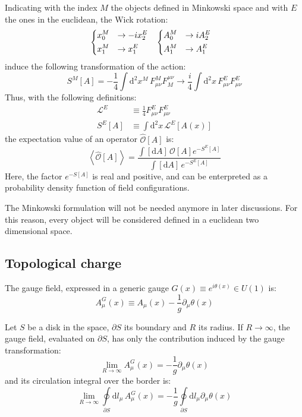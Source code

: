 Indicating with the index $M$ the objects defined in Minkowski space and with $E$ the ones in the euclidean, the Wick rotation:
\begin{align*}
    &\begin{dcases}
        x_0^M &\rightarrow -i x_2^E \\
        x_1^M &\rightarrow x_1^E
    \end{dcases}%
    &%
    \begin{dcases}
        A^M_0 &\rightarrow i A^E_2 \\
        A^M_1 &\rightarrow A^E_1 
    \end{dcases}&
\end{align*}
induce the following transformation of the action:
\[
    S^M[A] = -\frac{1}{4}\int\mathrm d^2x^M\,F^M_{\mu\nu}F_M^{\mu\nu} \rightarrow  \frac{i}{4}\int\mathrm d^2x\,F^E_{\mu\nu}F^E_{\mu\nu}
\]
Thus, with the following definitions:
\begin{equation}\label{eq:cont_action}
    \begin{aligned}
        \mathcal L^E &\equiv \frac{1}{4}F^E_{\mu\nu}F^E_{\mu\nu} \\
        S^E[A] &\equiv \int\mathrm d^2x\,\mathcal L^E[A(x)]
    \end{aligned}
\end{equation}
the expectation value of an operator $\widehat{\mathcal O}[A]$ is:
\begin{equation}\label{eq:cont_exp}
    \left< \widehat{\mathcal O}[A] \right> = \frac{\int[\mathrm dA]\, \mathcal O[A] e^{-S^E[A]}}{\int[\mathrm dA]\,e^{-S^E[A]}}
\end{equation}
Here, the factor $e^{-S[A]}$ is real and positive, and can be enterpreted as a probability density function of field configurations.

The Minkowski formulation will not be needed anymore in later discussions.
For this reason, every object will be considered defined in a euclidean two dimensional space.

\subsection*{Topological charge}

The gauge field, expressed in a generic gauge $G(x) \equiv e^{i\theta(x)} \in U(1)$ is:
\[
    A^G_\mu(x) \equiv A_\mu(x) - \frac{1}{g}\partial_\mu\theta(x)
\]

Let $S$ be a disk in the space, $\partial S$ its boundary and $R$ its radius.
If $R \to \infty$, the gauge field, evaluated on $\partial S$,
has only the contribution induced by the gauge transformation:
\[
    \lim_{R\to\infty}A^G_\mu(x) = -\frac{1}{g}\partial_\mu\theta(x)
\]
and its circulation integral over the border is:
\[
    \lim_{R\to\infty}\oint\limits_{\partial S}\mathrm dl_\mu\,A^G_\mu(x) = -\frac{1}{g}\oint\limits_{\partial S}\mathrm dl_\mu\partial_\mu\theta(x)
\]

